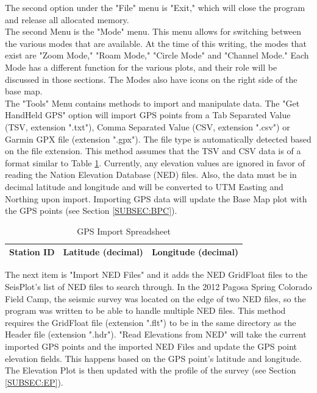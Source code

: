 \documentclass[12pt]{article}
\begin{document}
The second option under the "File" menu is "Exit," which will close the program and release all allocated memory. \\

The second Menu is the "Mode" menu. This menu allows for switching between the various modes that are available. At the time of this writing, the modes that exist are "Zoom Mode," "Roam Mode," "Circle Mode" and "Channel Mode." Each Mode has a different function for the various plots, and their role will be discussed in those sections. The Modes also have icons on the right side of the base map. \\

The "Tools" Menu contains methods to import and manipulate data. The "Get HandHeld GPS" option will import GPS points from a Tab Separated Value (TSV, extension ".txt"), Comma Separated Value (CSV, extension ".csv") or Garmin GPX file (extension ".gpx"). The file type is automatically detected based on the file extension. This method assumes that the TSV and CSV data is of a format similar to Table \ref{TAB:GPS2}. Currently, any elevation values are ignored in favor of reading the Nation Elevation Database (NED) files. Also, the data must be in decimal latitude and longitude and will be converted to UTM Easting and Northing upon import. Importing GPS data will update the Base Map plot with the GPS points (see Section \ref{SUBSEC:BPC}).\\

\begin{table}[h]
\caption{GPS Import Spreadsheet}
\centering
\begin{tabular}{ c | c | c}
  \hline                  
  Station ID & Latitude (decimal) & Longitude (decimal) \\
  \hline
\end{tabular}
\label{TAB:GPS2}
\end{table}

The next item is "Import NED Files" and it adds the NED GridFloat files to the SeisPlot's list of NED files to search through. In the 2012 Pagosa Spring Colorado Field Camp, the seismic survey was located on the edge of two NED files, so the program was written to be able to handle multiple NED files. This method requires the GridFloat file (extension ".flt") to be in the same directory as the Header file (extension ".hdr"). "Read Elevations from NED" will take the current imported GPS points and the imported NED Files and update the GPS point elevation fields. This happens based on the GPS point's latitude and longitude. The Elevation Plot is then updated with the profile of the survey (see Section \ref{SUBSEC:EP}). \\
\end{document}
